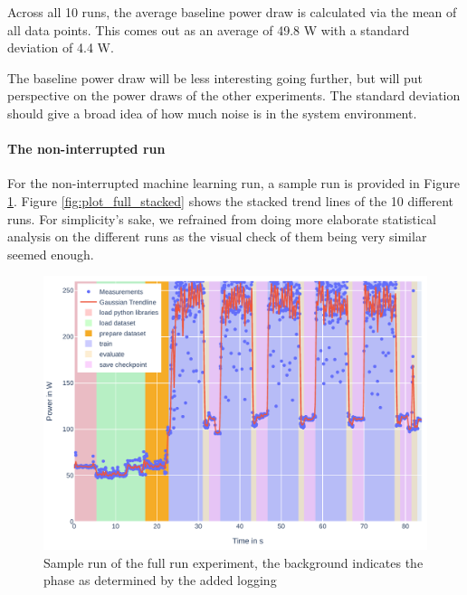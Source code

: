 Across all 10 runs, the average baseline power draw is calculated via the mean of all data points. This comes out as an average of 49.8 W with a standard deviation of 4.4 W.

The baseline power draw will be less interesting going further, but will put perspective on the power draws of the other experiments. The standard deviation should give a broad idea of how much noise is in the system environment.

\paragraph{The non-interrupted run}

For the non-interrupted machine learning run, a sample run is provided in Figure \ref{fig:plot_full}. 
Figure \ref{fig:plot_full_stacked} shows the stacked trend lines of the 10 different runs.
For simplicity's sake, we refrained from doing more elaborate statistical analysis on the different runs as the visual check of them being very similar seemed enough.

\begin{figure}
    \includegraphics[width=\linewidth]{power-measurements/measurements_roberta_full_0714010405/plot.pdf}
    \caption{Sample run of the full run experiment, the background indicates the phase as determined by the added logging}
    \label{fig:plot_full}
\end{figure}

